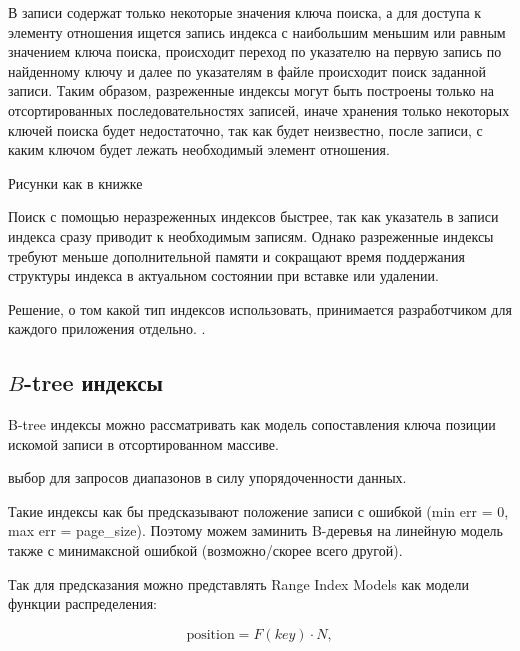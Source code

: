 
В  записи содержат только некоторые значения ключа
поиска, а для доступа к элементу отношения ищется запись индекса с наибольшим
меньшим или равным значением ключа поиска, происходит переход по указателю на
первую запись по найденному ключу и далее по указателям в файле происходит поиск
заданной записи. Таким образом, разреженные индексы могут быть построены только
на отсортированных последовательностях записей, иначе хранения только некоторых
ключей поиска будет недостаточно, так как будет неизвестно, после записи, с
каким ключом будет лежать необходимый элемент отношения.

Рисунки как в книжке

Поиск с помощью неразреженных индексов быстрее, так как указатель в записи
индекса сразу приводит к необходимым записям. Однако разреженные индексы требуют
меньше дополнительной памяти и сокращают время поддержания структуры индекса в
актуальном состоянии при вставке или удалении.

Решение, о том какой тип индексов использовать, принимается разработчиком для
каждого приложения отдельно. .

\subsection{$B$-tree индексы}

B-tree индексы можно рассматривать как модель сопоставления ключа позиции
искомой записи в отсортированном массиве.

 выбор для запросов диапазонов в силу упорядоченности данных.

Такие индексы как бы предсказывают положение записи с  ошибкой (min err = 0, max err = page\_size). Поэтому можем заминить
B-деревья на линейную модель также с минимаксной ошибкой (возможно/скорее всего
другой).

Так для предсказания можно представлять Range Index Models как модели функции
распределения:

\begin{equation}
    \text{position} = F(key) \cdot N,
\end{equation}


